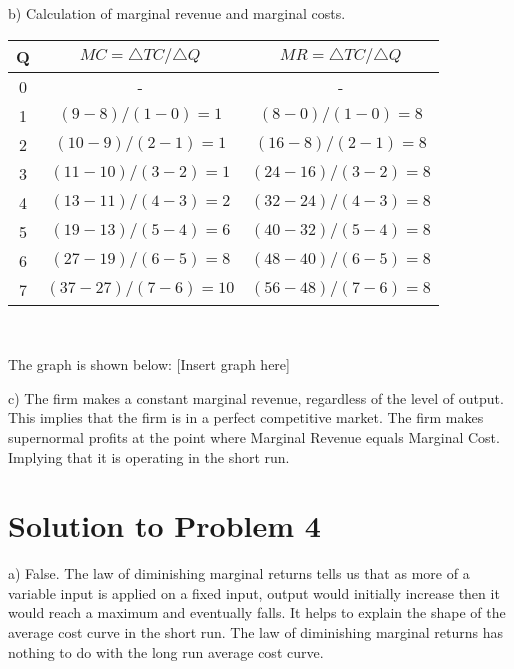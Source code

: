 \documentclass[12pt]{article}
\begin{document}
b) Calculation of marginal revenue and marginal costs.
\begin{center}
	\begin{tabular}{|c|c|c|}
		\hline
		Q & $ MC = \triangle TC/\triangle Q $                & $ MR = \triangle TC/\triangle Q $ \\
		\hline
		0 & -                                                & - \\
		1 & $\left(9 - 8\right) / \left(1 - 0\right) = 1$    & $ \left(8 - 0\right) / \left(1 - 0\right) = 8$ \\
		2 & $\left(10 - 9\right) / \left(2 - 1\right) = 1 $  & $ \left(16 - 8\right) / \left(2 - 1\right) = 8 $ \\
		3 &$ \left(11 - 10\right) / \left(3 - 2\right) = 1 $ & $ \left(24 - 16\right) / \left(3 - 2\right) = 8 $ \\
		4 &$ \left(13 - 11\right) / \left(4 - 3\right) = 2$  & $ \left(32 - 24\right) / \left(4 - 3\right) = 8 $ \\
		5 &$ \left(19 - 13\right) / \left(5 - 4\right) = 6  $& $ \left(40 - 32\right) / \left(5 - 4\right) = 8 $ \\
		6 &$ \left(27 - 19\right) / \left(6 - 5\right) = 8 $ & $ \left(48 - 40\right) / \left(6 - 5\right) = 8 $ \\
		7 &$ \left(37 - 27\right) / \left(7 - 6\right) = 10 $& $ \left(56 - 48\right) / \left(7 - 6\right) = 8 $ \\
		\hline
	\end{tabular}\\
\end{center}
	\vspace{0.5cm}
	The graph is shown below:
	[Insert graph here]
	
	c) The firm makes a constant marginal revenue, regardless of the level of output. This implies that the firm is in a perfect competitive market. 
	The firm makes supernormal profits at the point where Marginal Revenue equals Marginal Cost. Implying that it is operating in the short run.


\clearpage	

\section*{Solution to Problem 4}
a) False. The law of diminishing marginal returns tells us that as more of a variable input is applied on a fixed input, output would initially increase then it would reach a maximum and eventually falls. It helps to explain the shape of the average cost curve in the short run. The law of diminishing marginal returns has nothing to do with the long run average cost curve.
\end{document}
